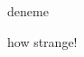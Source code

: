 \documentclass{article}
\begin{document}
deneme

\begin{minipage}{10cm}

\end{minipage}
how strange!
\end{document}
